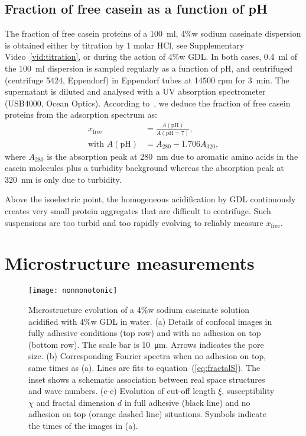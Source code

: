 \documentclass[twocolumn,superscriptaddress,showpacs,preprintnumbers,
amsmath,amssymb,prl]{revtex4-1}
\begin{document}
\subsection*{Fraction of free casein as a function of pH}

The fraction of free casein proteins of a \SI{100}{\milli\litre}, 4\%w sodium caseinate dispersion is obtained either by titration by 1 molar HCl, see Supplementary Video~\ref{vid:titration}, or during the action of 4\%w GDL. In both cases, \SI{0.4}{\milli\litre} of the \SI{100}{\milli\litre} dispersion is sampled regularly as a function of pH, and centrifuged (centrifuge 5424, Eppendorf) in Eppendorf tubes at 14500 rpm for \SI{3}{\minute}. The supernatant is diluted and analysed with a UV absorption spectrometer (USB4000, Ocean Optics). According to~\cite{Roefs1986}, we deduce the fraction of free casein proteins from the adsorption spectrum as:
%
\begin{align}
x_\text{free} &= \frac{A(\text{pH})}{A(\text{pH}=7)},\\
\text{with }A(\text{pH}) &= A_{280}-1.706 A_{320},
\end{align}
%
where $A_{280}$ is the absorption peak at \SI{280}{\nano\metre} due to aromatic amino acids in the casein molecules plus a turbidity background whereas the absorption peak at \SI{320}{\nano\metre} is only due to turbidity. 

Above the isoelectric point, the homogeneous acidification by GDL continuously creates very small protein aggregates that are difficult to centrifuge. Such suspensions are too turbid and too rapidly evolving to reliably measure $x_\text{free}$.

\section*{Microstructure measurements}

\begin{figure}
	\texttt{[image: nonmonotonic]}%
	\caption{Microstructure evolution of a 4\%w sodium caseinate solution acidified with 4\%w GDL in water. (a) Details of confocal images in fully adhesive conditions (top row) and with no adhesion on top (bottom row). The scale bar is \SI{10}{\micro\metre}. Arrows indicates the pore size. (b) Corresponding Fourier spectra when no adhesion on top, same times as (a). Lines are fits to equation~(\ref{eq:fractalS}). The inset shows a schematic association between real space structures and wave numbers. (c-e) Evolution of cut-off length $\xi$, susceptibility $\chi$ and fractal dimension $d$ in full adhesive (black line) and no adhesion on top (orange dashed line) situations. Symbols indicate the times of the images in (a).}%
	\label{fig:nonmonotonic}%
\end{figure}
\end{document}
